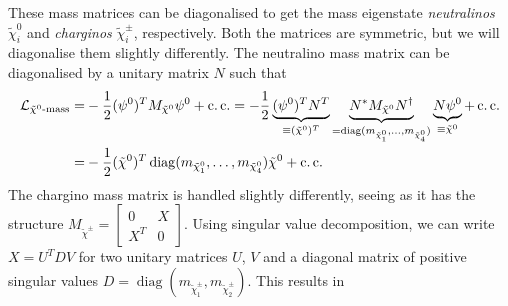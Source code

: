 \documentclass[../main.tex]{subfiles}
\begin{document}
These mass matrices can be diagonalised to get the mass eigenstate \emph{neutralinos} \(\tilde\chi^0_i\) and \emph{charginos} \(\tilde\chi^\pm_i\), respectively.
Both the matrices are symmetric, but we will diagonalise them slightly differently.
The neutralino mass matrix can be diagonalised by a unitary matrix \(N\) such that
\begin{align}
  \nonumber
  \mathcal{L}_{\tilde\chi^0\text{-mass}} = & -\frac{1}{2}(\psi^0)^T M_{\tilde\chi^0} \psi^0 + \operatorname{c.c.} = -\frac{1}{2} \underbrace{(\psi^0)^T N^T}_{\equiv (\tilde{\chi}^{0})^T} \underbrace{N^\ast M_{\tilde\chi^0} N^\dagger}_{= \operatorname{diag}(m_{\tilde\chi^0_1}, \ldots, m_{\tilde\chi^0_4})} \underbrace{N \psi^0}_{\equiv \tilde\chi^0} + \operatorname{c.c.} \\
  =                               & -\frac{1}{2} (\tilde\chi^0)^T \operatorname{diag}(m_{\tilde\chi^0_1}, \ldots, m_{\tilde\chi^0_4}) \tilde\chi^0 + \operatorname{c.c.}
\end{align}
The chargino mass matrix is handled slightly differently, seeing as it has the structure \(M_{\tilde\chi^\pm} = \begin{bmatrix}
  0 & X \\ X^T & 0
\end{bmatrix}\).
Using singular value decomposition, we can write \(X = U^T D V\) for two unitary matrices \(U\), \(V\) and a diagonal matrix of positive singular values \(D = \operatorname{diag}(m_{\tilde\chi^\pm_1}, m_{\tilde\chi^\pm_2})\).
This results in
\end{document}
